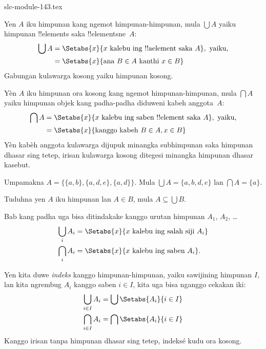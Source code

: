 \begin{filecontents*}[overwrite]{slc-module-143.tex}
\begin{defn}
Yen $A$ iku himpunan kang ngemot himpunan-himpunan,
mula $\bigcup A$ yaiku himpunan !!{element}s saka
!!{element}sne~$A$:
\begin{align*}
\bigcup A & = \Setabs{x}{x \text{ kalebu ing !!a{element} saka } A},
\text{ yaiku,}\\
& = \Setabs{x}{\text{ana } B \in A
  \text{ kanthi } x \in B}
\end{align*}
Gabungan kulawarga kosong yaiku himpunan kosong.
\end{defn}

\begin{defn}
Yèn $A$ iku himpunan ora kosong kang ngemot himpunan-himpunan,
mula $\bigcap A$ yaiku himpunan objek kang padha-padha diduweni
kabeh anggota~$A$:
\begin{align*}
\bigcap A & = \Setabs{x}{x \text{ kalebu ing saben !!{element} saka } A},
\text{ yaiku,}\\
 & = \Setabs{x}{\text{kanggo kabeh } B \in A, x \in B}
\end{align*}
Yèn kabèh anggota kulawarga dijupuk minangka subhimpunan saka
himpunan dhasar sing tetep, irisan kulawarga kosong ditegesi
minangka himpunan dhasar kasebut.
\end{defn}

\begin{ex}
Umpamakna $A = \{ \{ a, b \}, \{ a, d, e \}, \{ a, d \} \}$.
Mula $\bigcup A = \{ a, b, d, e \}$ lan $\bigcap A = \{ a \}$.
\end{ex}
\begin{prob}
	Tuduhna yen $A$ iku himpunan lan $A \in B$, mula $A \subseteq \bigcup B$.
\end{prob}

Bab kang padha uga bisa ditindakake kanggo urutan himpunan $A_1$, $A_2$, \dots
\begin{align*}
\bigcup_i A_i & = \Setabs{x}{x \text{ kalebu ing salah siji } A_i}\\
\bigcap_i A_i & = \Setabs{x}{x \text{ kalebu ing saben } A_i}.
\end{align*}

Yen kita duwe \emph{indeks} kanggo himpunan-himpunan, yaiku sawijining
himpunan $I$, lan kita ngrembug $A_i$ kanggo saben $i \in I$,
kita uga bisa nganggo cekakan iki:
\begin{align*}
	\bigcup_{i \in I} A_i & = \bigcup \Setabs{A_i }{i \in I}\\
	\bigcap_{i \in I} A_i & = \bigcap\Setabs{A_i}{i \in I}
\end{align*}
Kanggo irisan tanpa himpunan dhasar sing tetep, indeksé kudu ora kosong.


\end{filecontents*}
